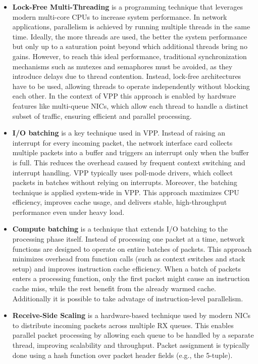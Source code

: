 \begin{itemize}
  \item \textbf{Lock-Free Multi-Threading}
is a programming technique that leverages modern multi-core CPUs to increase system performance. In network applications, parallelism is achieved by running multiple threads in the same time. 
Ideally, the more threads are used, the better the system performance but only up to a saturation point beyond which additional threads bring no gains. 
However, to reach this ideal performance, traditional synchronization mechanisms such as mutexes and semaphores must be avoided, as they introduce delays due to thread contention. 
Instead, lock-free architectures have to be used, allowing threads to operate independently without blocking each other. 
In the context of VPP this approach is enabled by hardware features like multi-queue NICs, 
which allow each thread to handle a distinct subset of traffic, ensuring efficient and parallel processing.~\cite{LINGUAGLOSSA}

  \item \textbf{I/O batching}
is a key technique used in VPP. 
Instead of raising an interrupt for every incoming packet, the network interface card collects multiple packets into a buffer and triggers an interrupt only when the buffer is full. 
This reduces the overhead caused by frequent context switching and interrupt handling. 
VPP typically uses poll-mode drivers, which collect packets in batches without relying on interrupts. 
Moreover, the batching technique is applied system-wide in VPP. 
This approach maximizes CPU efficiency, improves cache usage, and delivers stable, high-throughput performance even under heavy load.~\cite{LINGUAGLOSSA}

  \item \textbf{Compute batching} 
is a technique that extends I/O batching to the processing phase itself. 
Instead of processing one packet at a time, network functions are designed to operate on entire batches of packets. 
This approach minimizes overhead from function calls (such as context switches and stack setup) and improves instruction cache efficiency. 
When a batch of packets enters a processing function, only the first packet might cause an instruction cache miss, while the rest benefit from the already warmed cache.
Additionally it is possible to take advatage of instruction-level parallelism.~\cite{LINGUAGLOSSA}
  
  \item \textbf{Receive-Side Scaling}
is a hardware-based technique used by modern NICs to distribute incoming packets across multiple RX queues. 
This enables parallel packet processing by allowing each queue to be handled by a separate thread, improving scalability and throughput. 
Packet assignment is typically done using a hash function over packet header fields (e.g., the 5-tuple).~\cite{LINGUAGLOSSA}


\end{itemize}
